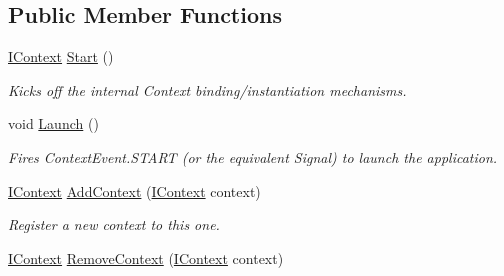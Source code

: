 \subsection*{Public Member Functions}
\begin{DoxyCompactItemize}
\item 
\hypertarget{interfacestrange_1_1extensions_1_1context_1_1api_1_1_i_context_ab29c9eb26414deed84d0e02ef1c12869}{\hyperlink{interfacestrange_1_1extensions_1_1context_1_1api_1_1_i_context}{I\-Context} \hyperlink{interfacestrange_1_1extensions_1_1context_1_1api_1_1_i_context_ab29c9eb26414deed84d0e02ef1c12869}{Start} ()}\label{interfacestrange_1_1extensions_1_1context_1_1api_1_1_i_context_ab29c9eb26414deed84d0e02ef1c12869}

\begin{DoxyCompactList}\small\item\em Kicks off the internal Context binding/instantiation mechanisms. \end{DoxyCompactList}\item 
\hypertarget{interfacestrange_1_1extensions_1_1context_1_1api_1_1_i_context_a2990b107f219e79a1ed87695732c6533}{void \hyperlink{interfacestrange_1_1extensions_1_1context_1_1api_1_1_i_context_a2990b107f219e79a1ed87695732c6533}{Launch} ()}\label{interfacestrange_1_1extensions_1_1context_1_1api_1_1_i_context_a2990b107f219e79a1ed87695732c6533}

\begin{DoxyCompactList}\small\item\em Fires Context\-Event.\-S\-T\-A\-R\-T (or the equivalent Signal) to launch the application. \end{DoxyCompactList}\item 
\hypertarget{interfacestrange_1_1extensions_1_1context_1_1api_1_1_i_context_a7aef991d8881ce583bcde52fd0c29c4d}{\hyperlink{interfacestrange_1_1extensions_1_1context_1_1api_1_1_i_context}{I\-Context} \hyperlink{interfacestrange_1_1extensions_1_1context_1_1api_1_1_i_context_a7aef991d8881ce583bcde52fd0c29c4d}{Add\-Context} (\hyperlink{interfacestrange_1_1extensions_1_1context_1_1api_1_1_i_context}{I\-Context} context)}\label{interfacestrange_1_1extensions_1_1context_1_1api_1_1_i_context_a7aef991d8881ce583bcde52fd0c29c4d}

\begin{DoxyCompactList}\small\item\em Register a new context to this one. \end{DoxyCompactList}\item 
\hypertarget{interfacestrange_1_1extensions_1_1context_1_1api_1_1_i_context_a9b8d03c5de1047d56e7f5a5b64a3b23e}{\hyperlink{interfacestrange_1_1extensions_1_1context_1_1api_1_1_i_context}{I\-Context} \hyperlink{interfacestrange_1_1extensions_1_1context_1_1api_1_1_i_context_a9b8d03c5de1047d56e7f5a5b64a3b23e}{Remove\-Context} (\hyperlink{interfacestrange_1_1extensions_1_1context_1_1api_1_1_i_context}{I\-Context} context)}\label{interfacestrange_1_1extensions_1_1context_1_1api_1_1_i_context_a9b8d03c5de1047d56e7f5a5b64a3b23e}


\end{DoxyCompactItemize}
